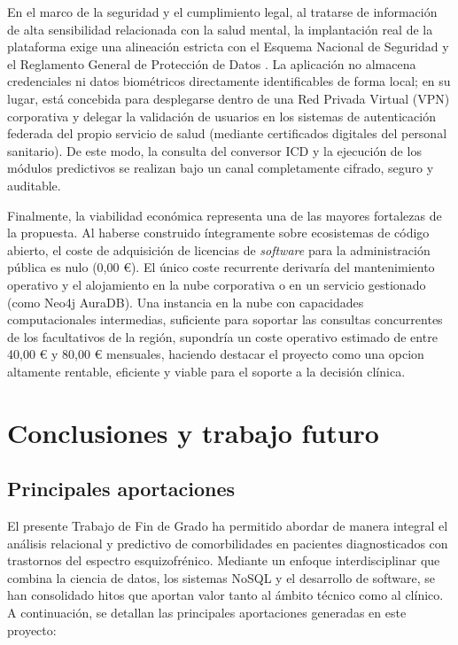 \documentclass[12pt,a4paper,onecolumn,oneside]{report}
\begin{document}
En el marco de la seguridad y el cumplimiento legal, al tratarse de información de alta sensibilidad relacionada con la salud mental, la implantación real de la plataforma exige una alineación estricta con el Esquema Nacional de Seguridad \cite{lopdgdd2018} y el Reglamento General de Protección de Datos \cite{rgpd2016}. La aplicación no almacena credenciales ni datos biométricos directamente identificables de forma local; en su lugar, está concebida para desplegarse dentro de una Red Privada Virtual (VPN) corporativa y delegar la validación de usuarios en los sistemas de autenticación federada del propio servicio de salud (mediante certificados digitales del personal sanitario). De este modo, la consulta del conversor ICD y la ejecución de los módulos predictivos se realizan bajo un canal completamente cifrado, seguro y auditable.

Finalmente, la viabilidad económica representa una de las mayores fortalezas de la propuesta. Al haberse construido íntegramente sobre ecosistemas de código abierto, el coste de adquisición de licencias de \textit{software} para la administración pública es nulo (0,00 €). El único coste recurrente derivaría del mantenimiento operativo y el alojamiento en la nube corporativa o en un servicio gestionado (como Neo4j AuraDB). Una instancia en la nube con capacidades computacionales intermedias, suficiente para soportar las consultas concurrentes de los facultativos de la región, supondría un coste operativo estimado de entre 40,00 € y 80,00 € mensuales, haciendo destacar el proyecto como una opcion altamente rentable, eficiente y viable para el soporte a la decisión clínica.

\chapter{Conclusiones y trabajo futuro} 
\section{Principales aportaciones}

El presente Trabajo de Fin de Grado ha permitido abordar de manera integral el análisis relacional y predictivo de comorbilidades en pacientes diagnosticados con trastornos del espectro esquizofrénico. Mediante un enfoque interdisciplinar que combina la ciencia de datos, los sistemas NoSQL y el desarrollo de software, se han consolidado hitos que aportan valor tanto al ámbito técnico como al clínico. A continuación, se detallan las principales aportaciones generadas en este proyecto:
\end{document}
